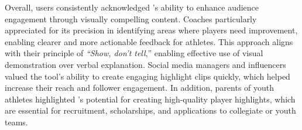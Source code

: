 Overall, users consistently acknowledged \SB{}'s ability to enhance audience engagement through visually compelling content. 
Coaches particularly appreciated \SB{} for its precision in identifying areas where players need improvement, enabling clearer and more actionable feedback for athletes. This approach aligns with their principle of \textit{``Show, don't tell},'' enabling effective use of visual demonstration over verbal explanation. 
Social media managers and influencers valued the tool’s ability to create engaging highlight clips quickly, which helped increase their reach and follower engagement.
% 
In addition, parents of youth athletes highlighted \SB{}'s potential for creating high-quality player highlights, which are essential for recruitment, scholarships, and applications to collegiate or youth teams. 
% 





